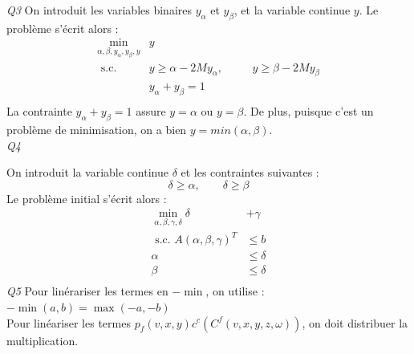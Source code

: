 \documentclass[a4paper,12pt]{article}
\begin{document}
    \textit{Q3 }
    On introduit les variables binaires $y_\alpha$ et $y_\beta$, et la variable continue $y$.
    Le problème s'écrit alors :
    \begin{equation}
        \begin{alignedat}{2}
            \min _{\alpha, \beta, y_\alpha, y_\beta, y} & y \\
            \text{ s.c. } 
            &y \geq \alpha - 2M y_\alpha, & \quad& y \geq \beta - 2M y_\beta \\
            &y_\alpha + y_\beta = 1 \\
        \end{alignedat}
    \end{equation}
    La contrainte $y_\alpha + y_\beta = 1$ assure  $y = \alpha$ ou $y = \beta$.
    De plus, puisque c'est un problème de minimisation, on a bien $y = min(\alpha, \beta)$. \\
    \textit{Q4 }

    On introduit la variable continue $\delta$ et les contraintes suivantes :
    $$ \delta \geq \alpha, \qquad \delta \geq \beta $$
    Le problème initial s'écrit alors :
    \begin{equation}
        \begin{aligned}
            \min _{\alpha, \beta, \gamma, \delta}  \delta &+ \gamma \\
            \text{ s.c. }  A(\alpha, \beta, \gamma)^T &\leq b \\
            \alpha &\leq \delta \\
            \beta &\leq \delta \\
        \end{aligned}
    \end{equation}
    \textit{Q5 }
    Pour linérariser les termes en $-\min$, on utilise : $-\min(a,b) = \max(-a,-b)$ \\
    Pour linéariser les termes $p_f(v, x, y) c^c(C^f(v, x, y, z ,\omega))$, on doit distribuer la multiplication.
\end{document}

